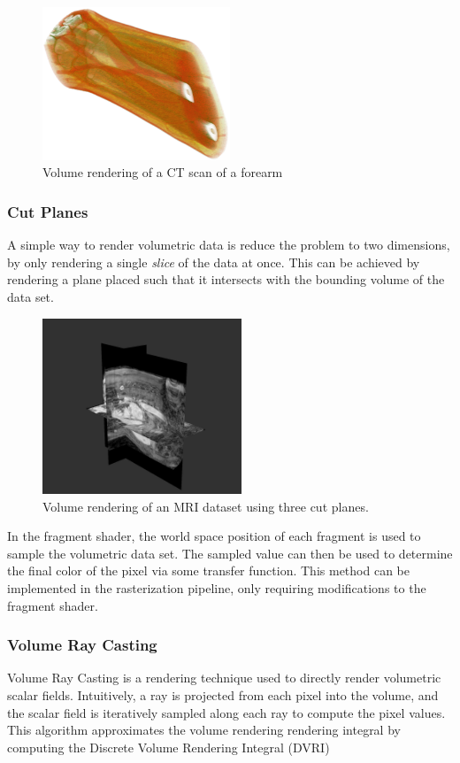 \documentclass{article}
\begin{document}
\begin{figure}[tbh]
    \centering
    \includegraphics[width=0.5\textwidth]{images/VolumeRendering.png}
    \caption{Volume rendering of a CT scan of a forearm}
    \label{fig:forearmCT}
\end{figure}

\subsubsection{Cut Planes}
A simple way to render volumetric data is reduce the problem to two dimensions, by only rendering a single \textit{slice} of the data
at once. This can be achieved by rendering a plane placed such that it intersects with the bounding volume of the 
data set. 
\begin{figure}[tbh!]
    \centering
    \includegraphics[width=0.53\textwidth]{images/CutPlanes.png}
    \caption{Volume rendering of an MRI dataset using three cut planes.}
    \label{fig:cutPlanes}
\end{figure}
In the fragment shader, the world space position of each fragment is used to sample the volumetric data set. The sampled value can then be used to determine the final color of the pixel via some transfer function.
This method can be implemented in the rasterization pipeline, only requiring modifications to the fragment shader. 

\subsubsection{Volume Ray Casting}
Volume Ray Casting is a rendering technique used to directly render volumetric scalar fields.
Intuitively, a ray is projected from each pixel into the volume,
and the scalar field is iteratively sampled along each ray to compute the pixel values.
This algorithm approximates the volume rendering rendering integral by computing the Discrete Volume Rendering Integral (DVRI) 
\end{document}
